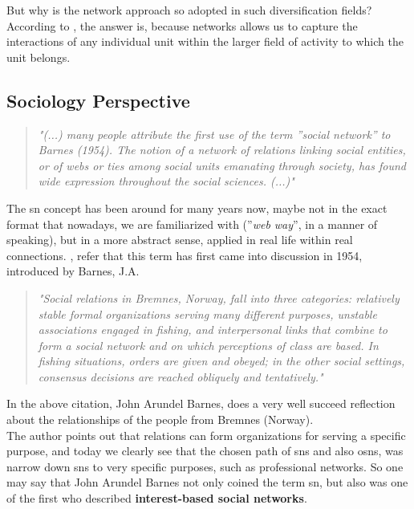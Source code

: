 \indent But why is the network approach so adopted in such diversification fields? According to \cite{kilduff2003social}, the answer is, because networks allows us to capture the interactions of any individual unit within the larger field of activity to which the unit belongs.

\subsection{Sociology Perspective}
\begin{quote}
\textit{"(...) many people attribute the first use of the term ''social network'' to
Barnes (1954). The notion of a network of relations linking social entities, or of webs or ties among social units emanating through society, has
found wide expression throughout the social sciences. (...)"}
\cite{wasserman1994social}
\end{quote}

The \gls{sn} concept has been around for many years now, maybe not in the exact format that nowadays, we are familiarized with (''\textit{web way}'', in a manner of speaking), but in a more abstract sense, applied in real life within real connections.
\cite{wasserman1994social}, refer that this term has first came into discussion in 1954, introduced by Barnes, J.A.

\begin{quote}
\textit{"Social relations in Bremnes, Norway, fall into three categories: relatively stable formal organizations serving many different
purposes, unstable associations engaged in fishing, and interpersonal links that combine to form a social
network and on which perceptions of class are based. In fishing situations, orders are given and
obeyed; in the other social settings, consensus decisions are reached obliquely and tentatively."}
\cite{barnes1954class}
\end{quote}

In the above citation, John Arundel Barnes, does a very well succeed reflection about the relationships of the people from Bremnes (Norway).\\
\indent The author points out that relations can form organizations for serving a specific purpose, and today we clearly see that the chosen path of
\glspl{sn} and also \glspl{osn}, was narrow down \glspl{sn} to very specific purposes, such as professional networks. So one may say that John
Arundel Barnes not only coined the term \gls{sn}, but also was one of the first who described \textbf{interest-based social networks}.\\


